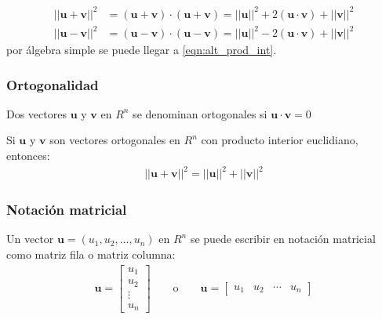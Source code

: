\documentclass[a4paper,12pt]{article}
\begin{document}
\demo
\begin{align*}
  ||\mathbf{u}+\mathbf{v}||^2&=(\mathbf{u}+\mathbf{v})\cdot(\mathbf{u}+\mathbf{v})=||\mathbf{u}||^2+2(\mathbf{u}\cdot\mathbf{v})+||\mathbf{v}||^2
  \\
  ||\mathbf{u}-\mathbf{v}||^2&=(\mathbf{u}-\mathbf{v})\cdot(\mathbf{u}-\mathbf{v})=||\mathbf{u}||^2-2(\mathbf{u}\cdot\mathbf{v})+||\mathbf{v}||^2
\end{align*}
por álgebra simple se puede llegar a \eqref{eqn:alt_prod_int}.

\subsubsection{Ortogonalidad}

\begin{concept}
  Dos vectores $\mathbf{u}$ y $\mathbf{v}$ en $R^n$ se denominan ortogonales
  si $\mathbf{u}\cdot\mathbf{v}=0$
\end{concept}

\begin{theorem}
  Si $\mathbf{u}$ y $\mathbf{v}$ son vectores ortogonales en $R^n$ con
  producto interior euclidiano, entonces:
  \begin{align*}
    ||\mathbf{u}+\mathbf{v}||^2=||\mathbf{u}||^2+||\mathbf{v}||^2
  \end{align*}
  \label{theo:pitagoras}
\end{theorem}

\subsubsection{Notación matricial}

Un vector $\mathbf{u}=(u_1,u_2,\ldots,u_n)$ en $R^n$ se puede escribir en
notación matricial como matriz fila o matriz columna:
\begin{align*}
  \mathbf{u}=
  \begin{bmatrix}
    u_1 \\
    u_2 \\
    \vdots \\
    u_n
  \end{bmatrix} \qquad \mbox{o} \qquad
  \mathbf{u}=
  \begin{bmatrix}
    u_1 & u_2 & \cdots & u_n
  \end{bmatrix}
\end{align*}
\end{document}
